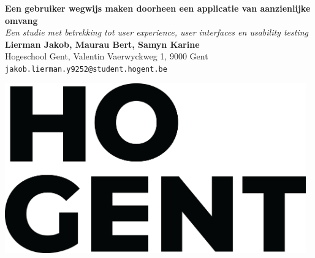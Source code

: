 \documentclass[a0,portrait]{a0poster}
\begin{document}


\begin{minipage}[t]{0.75\linewidth}
\VeryHuge \color{HoGentAccent1} \textbf{Een gebruiker wegwijs maken doorheen een applicatie van aanzienlijke omvang} \color{Black}\\ %
\Huge\textit{Een studie met betrekking tot user experience, user interfaces en usability testing}\\[2.4cm] %
\huge \textbf{Lierman Jakob, Maurau Bert, Samyn Karine}\\[0.5cm] %
\huge Hogeschool Gent, Valentin Vaerwyckweg 1, 9000 Gent\\[0.4cm] %
\Large \texttt{jakob.lierman.y9252@student.hogent.be} \\
\end{minipage}
%
\begin{minipage}[t]{0.25\linewidth}
\includegraphics[width=13cm,right]{figures/HOGENT_Logo_Pos_rgb.png} 

\end{minipage}

\vspace{1cm} %

\end{document}
